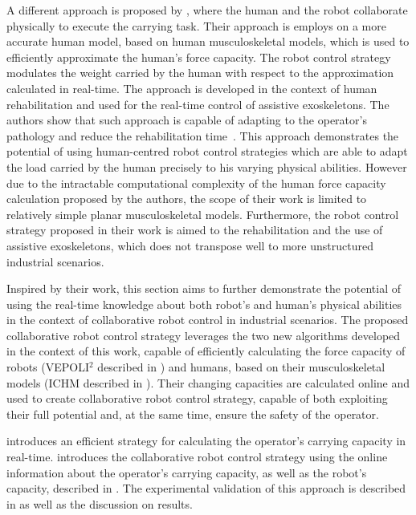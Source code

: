 A different approach is proposed by \citet{carmichael2013admittance}, where the human and the robot collaborate physically to execute the carrying task. Their approach is employs on a more accurate human model, based on human musculoskeletal models, which is used to efficiently approximate the human's force capacity. The robot control strategy modulates the weight carried by the human with respect to the approximation calculated in real-time. The approach is developed in the context of human rehabilitation and used for the real-time control of assistive exoskeletons. The authors show that such approach is capable of adapting to the operator's pathology and reduce the rehabilitation time~\cite{Carmichael2013Experimental}. 
This approach demonstrates the potential of using human-centred robot control strategies which are able to adapt the load carried by the human precisely to his varying physical abilities. However due to the intractable computational complexity of the human force capacity calculation proposed by the authors, the scope of their work is limited to relatively simple planar musculoskeletal models. Furthermore, the robot control strategy proposed in their work is aimed to the rehabilitation and the use of assistive exoskeletons, which does not transpose well to more unstructured industrial scenarios.

Inspired by their work, this section aims to further demonstrate the potential of using the real-time knowledge about both robot's and human's physical abilities in the context of collaborative robot control in industrial scenarios. The proposed collaborative robot control strategy leverages the two new algorithms developed in the context of this work, capable of efficiently calculating the force capacity of robots (VEPOLI$^2$ described in ) and humans, based on their musculoskeletal models (ICHM described in ). 
Their changing capacities are calculated online and used to create collaborative robot control strategy, capable of both exploiting their full potential and, at the same time, ensure the safety of the operator. 

 introduces an efficient strategy for calculating the operator's carrying capacity in real-time.  introduces the collaborative robot control strategy using the online information about the operator's carrying capacity, as well as the robot's capacity, described in  . The experimental validation of this approach is described in   as well as the discussion on results.

